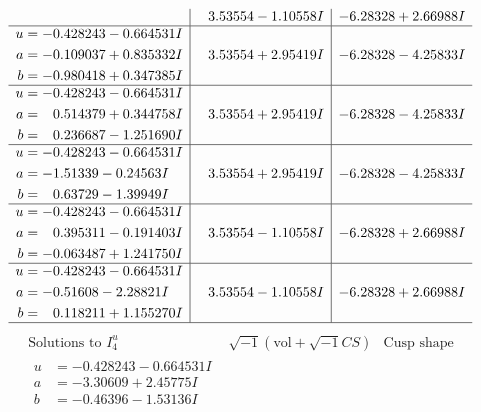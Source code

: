 \documentclass[1p]{elsarticle_modified}
\theoremstyle{definition}
\newcommand{\I}{\sqrt{-1}}
\begin{document}
$$\begin{array}{c|c|c}
 & \phantom{-}3.53554 - 1.10558 I & -6.28328 + 2.66988 I \\ \hline\begin{aligned}
u &= -0.428243 - 0.664531 I \\
a &= -0.109037 + 0.835332 I \\
b &= -0.980418 + 0.347385 I\end{aligned}
 & \phantom{-}3.53554 + 2.95419 I & -6.28328 - 4.25833 I \\ \hline\begin{aligned}
u &= -0.428243 - 0.664531 I \\
a &= \phantom{-}0.514379 + 0.344758 I \\
b &= \phantom{-}0.236687 - 1.251690 I\end{aligned}
 & \phantom{-}3.53554 + 2.95419 I & -6.28328 - 4.25833 I \\ \hline\begin{aligned}
u &= -0.428243 - 0.664531 I \\
a &= -1.51339 - 0.24563 I \\
b &= \phantom{-}0.63729 - 1.39949 I\end{aligned}
 & \phantom{-}3.53554 + 2.95419 I & -6.28328 - 4.25833 I \\ \hline\begin{aligned}
u &= -0.428243 - 0.664531 I \\
a &= \phantom{-}0.395311 - 0.191403 I \\
b &= -0.063487 + 1.241750 I\end{aligned}
 & \phantom{-}3.53554 - 1.10558 I & -6.28328 + 2.66988 I \\ \hline\begin{aligned}
u &= -0.428243 - 0.664531 I \\
a &= -0.51608 - 2.28821 I \\
b &= \phantom{-}0.118211 + 1.155270 I\end{aligned}
 & \phantom{-}3.53554 - 1.10558 I & -6.28328 + 2.66988 I\\
 \hline 
 \end{array}$$\newpage$$\begin{array}{c|c|c}  
\text{Solutions to }I^u_{4}& \I (\text{vol} + \sqrt{-1}CS) & \text{Cusp shape}\\
 \hline 
\begin{aligned}
u &= -0.428243 - 0.664531 I \\
a &= -3.30609 + 2.45775 I \\
b &= -0.46396 - 1.53136 I\end{aligned}

\end{array}$$
\end{document}
